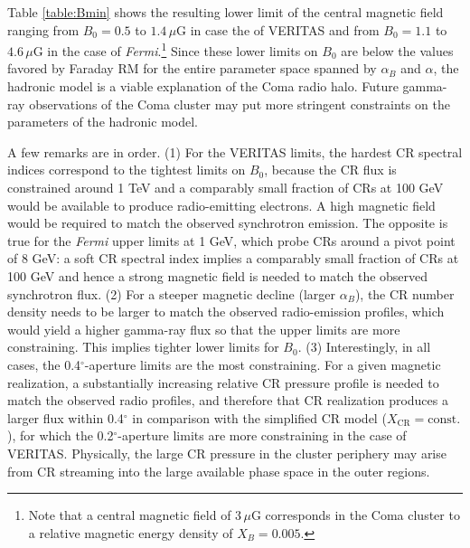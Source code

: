 \documentclass[12pt,manuscript]{aastex}
\def\Fermi{{\em Fermi}\xspace}
\newcommand{\rmn}{\mathrm}
\newcommand{\CR}{\mathrm{CR}}
\begin{document}
Table \ref{table:Bmin} shows the resulting lower limit of the central magnetic field ranging from
$B_{0} = 0.5$ to $1.4\,\mu$G in case the of VERITAS and from $B_{0} = 1.1$ to $4.6\,\mu$G in the
case of \Fermi.\footnote{Note that a central magnetic field of $3\,\mu$G corresponds in the
Coma cluster to a relative magnetic energy density of $X_B=0.005$.} Since these lower limits on
$B_{0}$ are below the values favored by Faraday RM for the entire parameter space spanned by
$\alpha_{B}$ and $\alpha$, the hadronic model is a viable explanation of the Coma radio halo. Future
gamma-ray observations of the Coma cluster may put more stringent constraints on the parameters of
the hadronic model.

A few remarks are in order. (1) For the VERITAS limits, the hardest
CR spectral indices correspond to the tightest limits on $B_{0}$, because the CR flux is constrained
around 1 TeV and a comparably small fraction of CRs at 100 GeV would be available to produce
radio-emitting electrons. A high magnetic field would be required to match the observed
synchrotron emission. The opposite is true for the \Fermi upper limits at 1 GeV, which
probe CRs around a pivot point of 8 GeV: a soft CR spectral index implies a comparably small
fraction of CRs at 100 GeV and hence a strong magnetic field is needed to match the observed
synchrotron flux. (2) For a steeper
magnetic decline (larger $\alpha_{B}$), the CR number density needs to be larger to match the
observed radio-emission profiles, which would yield a higher gamma-ray flux so that the upper limits
are more constraining. This implies tighter lower limits for $B_{0}$. (3) Interestingly, in all
cases, the 0.4$^{\circ}$-aperture limits are the most constraining. For a given magnetic
realization, a substantially increasing relative CR pressure profile is needed to match the
observed radio profiles, and therefore that CR realization produces a larger flux within 
0.4$^{\circ}$ in comparison with the simplified CR model ($X_{\CR} = \rmn{const.}$), for which the
0.2$^{\circ}$-aperture limits are more constraining in the case of VERITAS. Physically, the large
CR pressure in the cluster periphery may arise from CR streaming into the large available phase
space in the outer regions.
\end{document}
